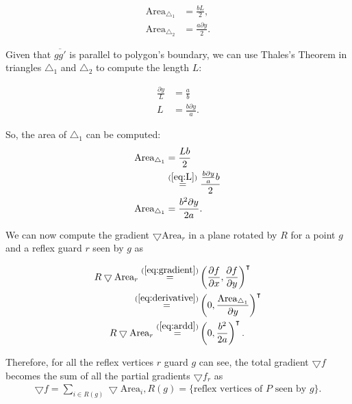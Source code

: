\begin{align*}
    \text{Area}_{\triangle_1} &= \frac{b L}{2},\\ 
    \text{Area}_{\triangle_2} &= \frac{a \partial y}{2}.
\end{align*}


Given that $\overline{gg'}$ is parallel to polygon's boundary, we can use Thales's Theorem in triangles $\triangle_1$ and $\triangle_2$ to compute the length $L$: 

\begin{align}
    \frac{\partial y}{L} &= \frac a b \\
    L &= \frac{b \partial y}{a}. \label{eq:L}
\end{align}

So, the area of $\triangle_1$ can be computed:
\begin{align}
    \text{Area}_{\triangle_1} &= \frac{Lb}{2} \\
    &\overset{(\ref{eq:L})}{=} \frac{\frac{b \partial y}{a}b}{2} \\
    \text{Area}_{\triangle_1} &= \frac{b^2 \partial y}{2a}. \label{eq:ardd}
\end{align}

We can now compute the gradient $\bigtriangledown \text{Area}_r$ in a plane rotated by $R$ for a point $g$ and a reflex guard $r$ seen by $g$ as

\begin{align}
    R\bigtriangledown \text{Area}_r \overset{(\ref{eq:gradient})}{=} &\left(\frac{\partial f}{\partial x}, \frac{\partial f}{\partial y}\right)^\intercal \\
    \overset{(\ref{eq:derivative})}{=} &\left(0, \frac{\text{Area}_{\triangle_1}}{\partial y}\right)^\intercal \\
    R\bigtriangledown \text{Area}_r \overset{(\ref{eq:ardd})}{=} &\left(0, \frac{b^2}{2a}\right)^\intercal. \label{eq:normf1}
\end{align}


Therefore, for all the reflex vertices $r$ guard $g$ can see, the total gradient $\bigtriangledown f$ becomes the sum of all the partial gradients $\bigtriangledown f_r$ as 
\begin{align}
    \bigtriangledown f = \sum_{i \in R(g)} \bigtriangledown \text{Area}_i, R(g) = \{\text{reflex vertices of } P \text{ seen by }g\}. \label{eq:normf2}
\end{align}

